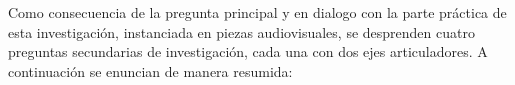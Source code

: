 


Como consecuencia de la pregunta principal y en dialogo con la parte práctica de esta investigación, instanciada en piezas audiovisuales, se desprenden cuatro preguntas secundarias de investigación, cada una con dos ejes articuladores. A continuación se enuncian de manera resumida: 


